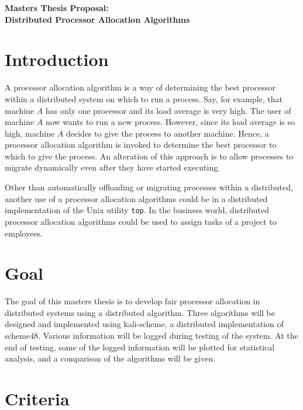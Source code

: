 \documentclass{article}
\begin{document}
\LARGE
\noindent \textbf{Masters Thesis Proposal:} \\
\noindent \textbf{Distributed Processor Allocation Algorithms} \\
\Large
{}

\normalsize
\vspace{1em}

\section{Introduction}


A processor allocation algorithm is a way of determining the best processor
within a distributed system on which to run a process.  Say, for example,
that machine $A$ has only one processor and its load average is very high.
The user of machine $A$ now wants to run a new process.  However, since its
load average is so high, machine $A$ decides to give the process to another
machine.  Hence, a processor allocation algorithm is invoked to determine
the best processor to which to give the process.  An alteration of this
approach is to allow processes to migrate dynamically even after they have
started executing.

Other than automatically offloading or migrating processes within a
distributed, another use of a processor allocation algorithms could be in a
distributed implementation of the Unix utility \texttt{top}.  In the
business world, distributed processor allocation algorithms could be used to
assign tasks of a project to employees.



\section{Goal} 

The goal of this masters thesis is to develop fair processor allocation in
distributed systems using a distributed algorithm.  Three algorithms will be
designed and implemented using kali-scheme, a distributed implementation of
scheme48.  Various information will be logged during testing of the system.
At the end of testing, some of the logged information will be plotted for
statistical analysis, and a comparison of the algorithms will be given.

\section{Criteria}
\end{document}
